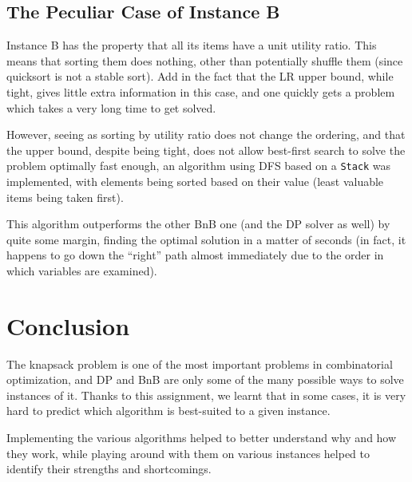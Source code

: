 \documentclass[journal]{IEEEtran}
\newcommand{\scala}[1]{\texttt{#1}}
\begin{document}
\subsection{The Peculiar Case of Instance B}
Instance B has the property that all its items have a unit utility ratio.
This means that sorting them does nothing, other than potentially shuffle them (since quicksort is not a stable sort).
Add in the fact that the LR upper bound, while tight, gives little extra information in this case, and one quickly gets a problem which takes a very long time to get solved.

However, seeing as sorting by utility ratio does not change the ordering, and that the upper bound, despite being tight, does not allow best-first search to solve the problem optimally fast enough, an algorithm using DFS based on a \scala{Stack} was implemented, with elements being sorted based on their value (least valuable items being taken first).

This algorithm outperforms the other BnB one (and the DP solver as well) by quite some margin, finding the optimal solution in a matter of seconds (in fact, it happens to go down the ``right'' path almost immediately due to the order in which variables are examined).

\section{Conclusion}
The knapsack problem is one of the most important problems in combinatorial optimization, and DP and BnB are only some of the many possible ways to solve instances of it.
Thanks to this assignment, we learnt that in some cases, it is very hard to predict which algorithm is best-suited to a given instance.

Implementing the various algorithms helped to better understand why and how they work, while playing around with them on various instances helped to identify their strengths and shortcomings.
\end{document}
